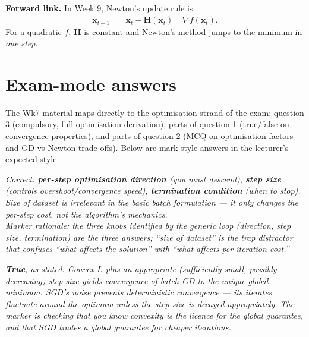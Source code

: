 \documentclass[11pt, a4paper]{article}
\begin{document}
\textbf{Forward link.} In Week 9, Newton's update rule is
\[
\mathbf{x}_{t+1} \;=\; \mathbf{x}_t - \mathbf{H}(\mathbf{x}_t)^{-1}\,\nabla f(\mathbf{x}_t).
\]
For a quadratic $f$, $\mathbf{H}$ is constant and Newton's method jumps to the minimum in \emph{one step}.

\section{Exam-mode answers}

The Wk7 material maps directly to the optimisation strand of the exam: question 3 (compulsory, full optimisation derivation), parts of question 1 (true/false on convergence properties), and parts of question 2 (MCQ on optimisation factors and GD-vs-Newton trade-offs). Below are mark-style answers in the lecturer's expected style.

\begin{exambox}
\textit{Correct: \textbf{per-step optimisation direction} (you must descend), \textbf{step size} (controls overshoot/convergence speed), \textbf{termination condition} (when to stop). Size of dataset is irrelevant in the basic batch formulation — it only changes the per-step cost, not the algorithm's mechanics.}\\[0.3em]
\textit{Marker rationale: the three knobs identified by the generic loop (direction, step size, termination) are the three answers; ``size of dataset'' is the trap distractor that confuses ``what affects the solution'' with ``what affects per-iteration cost.''}
\end{exambox}

\begin{exambox}
\textit{\textbf{True}, as stated. Convex $L$ plus an appropriate (sufficiently small, possibly decreasing) step size yields convergence of batch GD to the unique global minimum. SGD's noise prevents \emph{deterministic} convergence — its iterates fluctuate around the optimum unless the step size is decayed appropriately. The marker is checking that you know convexity is the licence for the global guarantee, and that SGD trades a global guarantee for cheaper iterations.}
\end{exambox}
\end{document}
